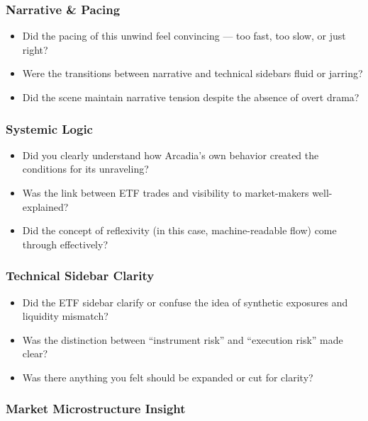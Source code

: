 \subsubsection{Narrative \& Pacing}

\begin{itemize}
  \item Did the pacing of this unwind feel convincing — too fast, too slow, or just right?
  \item Were the transitions between narrative and technical sidebars fluid or jarring?
  \item Did the scene maintain narrative tension despite the absence of overt drama?
\end{itemize}

\subsubsection{Systemic Logic}

\begin{itemize}
  \item Did you clearly understand how Arcadia’s own behavior created the conditions for its unraveling?
  \item Was the link between ETF trades and visibility to market-makers well-explained?
  \item Did the concept of reflexivity (in this case, machine-readable flow) come through effectively?
\end{itemize}

\subsubsection{Technical Sidebar Clarity}

\begin{itemize}
  \item Did the ETF sidebar clarify or confuse the idea of synthetic exposures and liquidity mismatch?
  \item Was the distinction between ``instrument risk'' and ``execution risk'' made clear?
  \item Was there anything you felt should be expanded or cut for clarity?
\end{itemize}

\subsubsection{Market Microstructure Insight}

